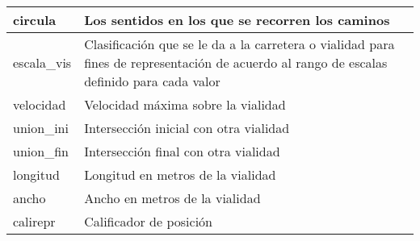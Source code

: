 \begin{longtable}{|p{8cm}|p{8cm}|}
    \hline
    circula & Los sentidos en los que se recorren los caminos\\
    \hline
    escala\_vis & Clasificación que se le da a la carretera o vialidad para fines de representación de acuerdo al rango de escalas definido para cada valor \\
    \hline
    velocidad & Velocidad máxima sobre la vialidad\\
    \hline
    union\_ini & Intersección inicial con otra vialidad\\
    \hline
    union\_fin & Intersección final con otra vialidad\\
    \hline
    longitud & Longitud en metros de la vialidad\\
    \hline
    ancho & Ancho en metros de la vialidad\\
    \hline
    calirepr & Calificador de posición \\
    \hline
\end{longtable}
\caption{Variables dentro de los archivos shape de la Red Carretera}
\label{tab:redcarretera}
